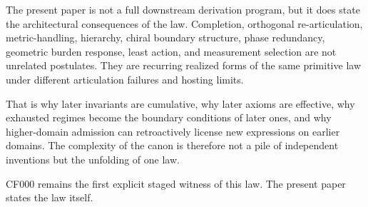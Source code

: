 \documentclass[11pt]{article}
\theoremstyle{definition}
\theoremstyle{plain}
\theoremstyle{remark}
\begin{document}
The present paper is not a full downstream derivation program, but it does
state the architectural consequences of the law. Completion, orthogonal
re-articulation, metric-handling, hierarchy, chiral boundary structure,
phase redundancy, geometric burden response, least action, and measurement
selection are not unrelated postulates. They are recurring realized forms of
the same primitive law under different articulation failures and hosting
limits.

That is why later invariants are cumulative, why later axioms are effective,
why exhausted regimes become the boundary conditions of later ones, and why
higher-domain admission can retroactively license new expressions on earlier
domains. The complexity of the canon is therefore not a pile of independent
inventions but the unfolding of one law.

CF000 remains the first explicit staged witness of this law. The present
paper states the law itself.
\end{document}
